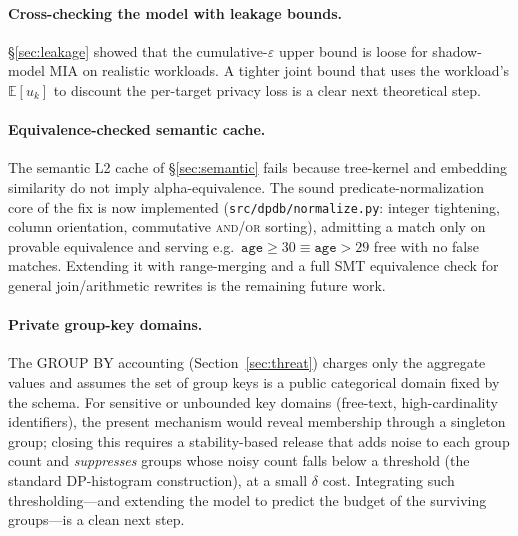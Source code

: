 \documentclass[sigconf,nonacm]{acmart}
\newcommand{\eps}{\varepsilon}
\newcommand{\E}{\mathbb{E}}
\begin{document}
\paragraph{Cross-checking the model with leakage bounds.}
§\ref{sec:leakage} showed that the cumulative-$\eps$ upper bound is loose for shadow-model MIA on realistic workloads. A tighter joint bound that uses the workload's $\E[u_k]$ to discount the per-target privacy loss is a clear next theoretical step.

\paragraph{Equivalence-checked semantic cache.}
The semantic L2 cache of §\ref{sec:semantic} fails because tree-kernel and embedding similarity do not imply alpha-equivalence. The sound predicate-normalization core of the fix is now implemented (\texttt{src/dpdb/normalize.py}: integer tightening, column orientation, commutative \textsc{and}/\textsc{or} sorting), admitting a match only on provable equivalence and serving e.g.\ $\texttt{age}\ge30\equiv\texttt{age}>29$ free with no false matches. Extending it with range-merging and a full SMT equivalence check for general join/arithmetic rewrites is the remaining future work.

\paragraph{Private group-key domains.}
The GROUP BY accounting (Section~\ref{sec:threat}) charges only the aggregate values and assumes the set of group keys is a public categorical domain fixed by the schema. For sensitive or unbounded key domains (free-text, high-cardinality identifiers), the present mechanism would reveal membership through a singleton group; closing this requires a stability-based release that adds noise to each group count and \emph{suppresses} groups whose noisy count falls below a threshold (the standard DP-histogram construction), at a small $\delta$ cost. Integrating such thresholding---and extending the model to predict the budget of the surviving groups---is a clean next step.
\end{document}
